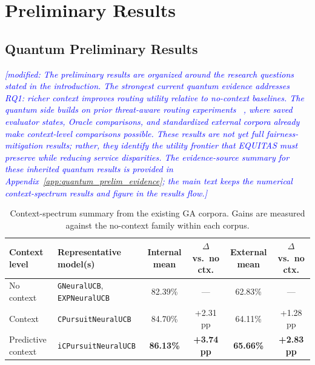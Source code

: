 \documentclass[conference]{IEEEtran}
\newcommand{\modified}[1]{\textcolor{blue}{{\it [modified: #1]}}}
\begin{document}
\section{Preliminary Results}
\subsection{Quantum Preliminary Results}
\modified{The preliminary results are organized around the research questions stated in
the introduction. The strongest current quantum evidence addresses RQ1: richer
context improves routing utility relative to no-context baselines. The quantum
side builds on prior threat-aware routing experiments
~\cite{garcia2026threat_aware_quantum_routing}, where saved evaluator states,
Oracle comparisons, and standardized external corpora already make
context-level comparisons possible. These results are not yet full
fairness-mitigation results; rather, they identify the utility frontier that
EQUITAS must preserve while reducing service disparities. The evidence-source
summary for these inherited quantum results is provided in
Appendix~\ref{app:quantum_prelim_evidence}; the main text keeps the numerical
context-spectrum results and figure in the results flow.}

\begin{table}[t]
\caption{Context-spectrum summary from the existing GA corpora. Gains are measured
against the no-context family within each corpus.}
\label{tab:context_spectrum}
\centering
\small
\setlength{\tabcolsep}{5pt}
\begin{tabular}{p{}p{}cccc}
\toprule
\textbf{Context level} & \textbf{Representative model(s)} & \textbf{Internal mean} & \textbf{$\Delta$ vs.\ no ctx.} & \textbf{External mean} & \textbf{$\Delta$ vs.\ no ctx.} \\
\midrule
No context & \texttt{GNeuralUCB}, \texttt{EXPNeuralUCB} & 82.39\% & --- & 62.83\% & --- \\
Context & \texttt{CPursuitNeuralUCB} & 84.70\% & +2.31 pp & 64.11\% & +1.28 pp \\
Predictive context & \texttt{iCPursuitNeuralUCB} & \textbf{86.13\%} & \textbf{+3.74 pp} & \textbf{65.66\%} & \textbf{+2.83 pp} \\
\bottomrule
\end{tabular}
\end{table}
\end{document}
